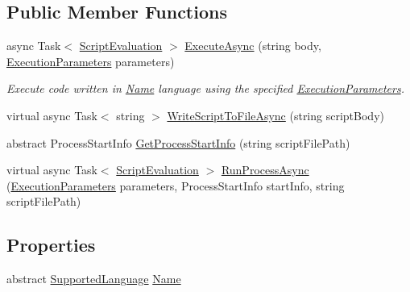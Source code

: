 \subsection*{Public Member Functions}
\begin{DoxyCompactItemize}
\item 
async Task$<$ \mbox{\hyperlink{class_code_a_friend_1_1_data_model_1_1_script_evaluation}{Script\+Evaluation}} $>$ \mbox{\hyperlink{class_code_a_friend_1_1_languages_1_1_core_1_1_interpreter_template_ae2cf761e61f7b6b6fc553703ea3ba3c5}{Execute\+Async}} (string body, \mbox{\hyperlink{class_code_a_friend_1_1_data_model_1_1_execution_parameters}{Execution\+Parameters}} parameters)
\begin{DoxyCompactList}\small\item\em Execute code written in \mbox{\hyperlink{interface_code_a_friend_1_1_data_model_1_1_i_language_interpreter_ab8d4ee55278929fb59f3f015789aaa36}{Name}} language using the specified \mbox{\hyperlink{class_code_a_friend_1_1_data_model_1_1_execution_parameters}{Execution\+Parameters}}.  \end{DoxyCompactList}\item 
virtual async Task$<$ string $>$ \mbox{\hyperlink{class_code_a_friend_1_1_languages_1_1_core_1_1_interpreter_template_aedeed04eb6f14cb6bec2a9f250b71ebb}{Write\+Script\+To\+File\+Async}} (string script\+Body)
\item 
abstract Process\+Start\+Info \mbox{\hyperlink{class_code_a_friend_1_1_languages_1_1_core_1_1_interpreter_template_a2f8560fba2e22a9cdf22c8d2f7bb849f}{Get\+Process\+Start\+Info}} (string script\+File\+Path)
\item 
virtual async Task$<$ \mbox{\hyperlink{class_code_a_friend_1_1_data_model_1_1_script_evaluation}{Script\+Evaluation}} $>$ \mbox{\hyperlink{class_code_a_friend_1_1_languages_1_1_core_1_1_interpreter_template_aa76d5e57b00dfa82862362288d140e1b}{Run\+Process\+Async}} (\mbox{\hyperlink{class_code_a_friend_1_1_data_model_1_1_execution_parameters}{Execution\+Parameters}} parameters, Process\+Start\+Info start\+Info, string script\+File\+Path)
\end{DoxyCompactItemize}
\subsection*{Properties}
\begin{DoxyCompactItemize}
\item 
abstract \mbox{\hyperlink{namespace_code_a_friend_1_1_data_model_a13e088c525db1b03a4de75420ced79b2}{Supported\+Language}} \mbox{\hyperlink{class_code_a_friend_1_1_languages_1_1_core_1_1_interpreter_template_a7c5eeadd02916f2e314f3290d1dbdc8c}{Name}}
\end{DoxyCompactItemize}


